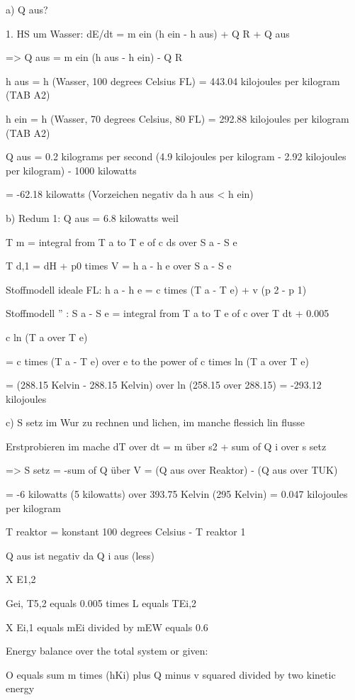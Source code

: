 a) Q aus?

1. HS um Wasser: dE/dt = m ein (h ein - h aus) + Q R + Q aus

=> Q aus = m ein (h aus - h ein) - Q R

h aus = h (Wasser, 100 degrees Celsius FL) = 443.04 kilojoules per kilogram (TAB A2)

h ein = h (Wasser, 70 degrees Celsius, 80 FL) = 292.88 kilojoules per kilogram (TAB A2)

Q aus = 0.2 kilograms per second (4.9 kilojoules per kilogram - 2.92 kilojoules per kilogram) - 1000 kilowatts

= -62.18 kilowatts (Vorzeichen negativ da h aus < h ein)

b) Redum 1: Q aus = 6.8 kilowatts weil

T m = integral from T a to T e of c ds over S a - S e

T d,1 = dH + p0 times V = h a - h e over S a - S e

Stoffmodell ideale FL: h a - h e = c times (T a - T e) + v (p 2 - p 1)

Stoffmodell '' : S a - S e = integral from T a to T e of c over T dt + 0.005

c ln (T a over T e)

= c times (T a - T e) over e to the power of c times ln (T a over T e)

= (288.15 Kelvin - 288.15 Kelvin) over ln (258.15 over 288.15) = -293.12 kilojoules

c) S setz im Wur zu rechnen und lichen, im manche flessich lin flusse

Erstprobieren im mache dT over dt = m über s2 + sum of Q i over s setz

=> S setz = -sum of Q über V = (Q aus over Reaktor) - (Q aus over TUK)

= -6 kilowatts (5 kilowatts) over 393.75 Kelvin (295 Kelvin) = 0.047 kilojoules per kilogram

T reaktor = konstant 100 degrees Celsius - T reaktor 1

Q aus ist negativ da Q i aus (less)

X E1,2

Gei, T5,2 equals 0.005 times L equals TEi,2

X Ei,1 equals mEi divided by mEW equals 0.6

Energy balance over the total system or given:

O equals sum m times (hKi) plus Q minus v squared divided by two kinetic energy

